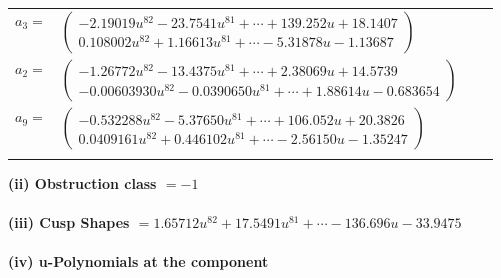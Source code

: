\documentclass[1p]{elsarticle_modified}
\theoremstyle{definition}
\begin{document}
\begin{tabular}{m{7pt} m{180pt} m{7pt} m{180pt} }
\flushright $a_{3}=$&$\begin{pmatrix}-2.19019 u^{82}-23.7541 u^{81}+\cdots+139.252 u+18.1407\\0.108002 u^{82}+1.16613 u^{81}+\cdots-5.31878 u-1.13687\end{pmatrix}$ \\
\flushright $a_{2}=$&$\begin{pmatrix}-1.26772 u^{82}-13.4375 u^{81}+\cdots+2.38069 u+14.5739\\-0.00603930 u^{82}-0.0390650 u^{81}+\cdots+1.88614 u-0.683654\end{pmatrix}$ \\
\flushright $a_{9}=$&$\begin{pmatrix}-0.532288 u^{82}-5.37650 u^{81}+\cdots+106.052 u+20.3826\\0.0409161 u^{82}+0.446102 u^{81}+\cdots-2.56150 u-1.35247\end{pmatrix}$\\&\end{tabular}
\flushleft \textbf{(ii) Obstruction class $= -1$}\\~\\
\flushleft \textbf{(iii) Cusp Shapes $= 1.65712 u^{82}+17.5491 u^{81}+\cdots-136.696 u-33.9475$}\\~\\
\newpage\renewcommand{\arraystretch}{1}
\flushleft \textbf{(iv) u-Polynomials at the component}\newline \\
\end{document}
